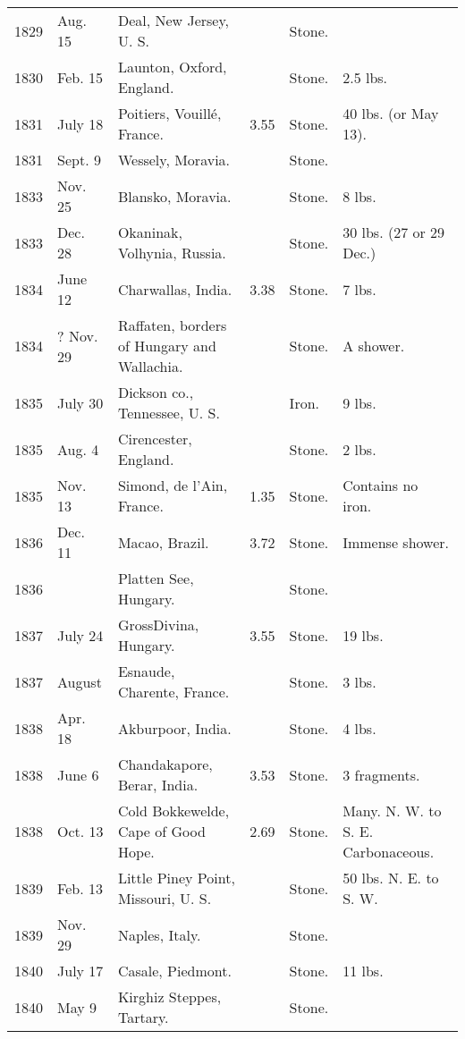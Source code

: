 \documentclass[a4paper, 12pt, oneside]{article}
\begin{document}
\begin{center}
\begin{longtable}{|p{10mm}|p{15mm}|p{32mm}|p{13mm}|p{13mm}|p{26mm}|}
        1829 & Aug. 15 & Deal, New Jersey, U. S. & ~ & Stone. & ~ \\
        1830 & Feb. 15 & Launton, Oxford, England. & ~ & Stone. & 2.5 lbs. \\
        1831 & July 18 & Poitiers, Vouillé, France. & 3.55 & Stone. & 40 lbs. (or May 13). \\
        1831 & Sept. 9 & Wessely, Moravia. & ~ & Stone. & ~ \\
        1833 & Nov. 25 & Blansko, Moravia. & ~ & Stone. & 8 lbs. \\
        1833 & Dec. 28 & Okaninak, Volhynia, Russia. & ~ & Stone. & 30 lbs. (27 or 29 Dec.) \\
        1834 & June 12 & Charwallas, India. & 3.38 & Stone. & 7 lbs. \\
        1834 & ? Nov. 29 & Raffaten, borders of Hungary and Wallachia. & ~ & Stone. & A shower. \\
        1835 & July 30 & Dickson co., Tennessee, U. S. & ~ & Iron. & 9 lbs. \\
        1835 & Aug. 4 & Cirencester, England. & ~ & Stone. & 2 lbs. \\
        1835 & Nov. 13 & Simond, de l’Ain, France. & 1.35 & Stone. & Contains no iron. \\
        1836 & Dec. 11 & Macao, Brazil. & 3.72 & Stone. & Immense shower. \\
        1836 & ~ & Platten See, Hungary. & ~ & Stone. & ~ \\
        1837 & July 24 & Gross\-Divina, Hungary. & 3.55 & Stone. & 19 lbs. \\
        1837 & August & Esnaude, Charente, France. & ~ & Stone. & 3 lbs. \\
        1838 & Apr. 18 & Akburpoor, India. & ~ & Stone. & 4 lbs. \\
        1838 & June 6 & Chandakapore, Berar, India. & 3.53 & Stone. & 3 fragments. \\
        1838 & Oct. 13 & Cold Bokkewelde, Cape of Good Hope. & 2.69 & Stone. & Many. N. W. to S. E. Carbonaceous. \\
        1839 & Feb. 13 & Little Piney Point, Missouri, U. S. & ~ & Stone. & 50 lbs. N. E. to S. W. \\
        1839 & Nov. 29 & Naples, Italy. & ~ & Stone. & ~ \\
        1840 & July 17 & Casale, Piedmont. & ~ & Stone. & 11 lbs. \\
        1840 & May 9 & Kirghiz Steppes, Tartary. & ~ & Stone. & ~ \\

\end{longtable}
\end{center}
\end{document}
